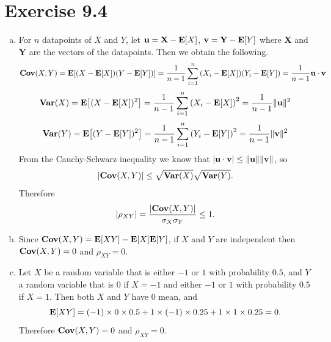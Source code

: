 \documentclass{article}
\begin{document}
\section*{Exercise 9.4}
\begin{enumerate}[(a)]
    \item For $n$ datapoints of $X$ and $Y$, let $\mathbf{u} = \mathbf{X} - \mathbf{E}\qty[X]$, $\mathbf{v} = \mathbf{Y} - \mathbf{E}\qty[Y]$ where $\mathbf{X}$ and $\mathbf{Y}$ are the vectors of the datapoints.
    Then we obtain the following.
    $$\mathbf{Cov}\qty(X, Y) = \mathbf{E}\qty[(X - \mathbf{E}\qty[X])(Y - \mathbf{E}\qty[Y])] = \frac{1}{n-1}\sum_{i=1}^{n}\qty(X_i - \mathbf{E}\qty[X])(Y_i - \mathbf{E}\qty[Y]) = \frac{1}{n-1}\mathbf{u}\cdot\mathbf{v}$$
    $$\mathbf{Var}\qty(X) = \mathbf{E}\qty[(X - \mathbf{E}\qty[X])^2] = \frac{1}{n-1}\sum_{i=1}^{n}\qty(X_i - \mathbf{E}\qty[X])^2 = \frac{1}{n-1}\lVert\mathbf{u}\rVert^2$$
    $$\mathbf{Var}\qty(Y) = \mathbf{E}\qty[(Y - \mathbf{E}\qty[Y])^2] = \frac{1}{n-1}\sum_{i=1}^{n}\qty(Y_i - \mathbf{E}\qty[Y])^2 = \frac{1}{n-1}\lVert\mathbf{v}\rVert^2$$
    From the Cauchy-Schwarz inequality we know that $\qty|\mathbf{u}\cdot\mathbf{v}| \leq \lVert\mathbf{u}\rVert\lVert\mathbf{v}\rVert$, so 
    $$\qty|\mathbf{Cov}\qty(X, Y)| \leq \sqrt{\mathbf{Var}\qty(X)}\sqrt{\mathbf{Var}\qty(Y)}.$$
    Therefore
    $$\qty|\rho_{XY}| = \frac{\qty|\mathbf{Cov}\qty(X, Y)|}{\sigma_X\sigma_Y} \leq 1.$$
    \item Since $\mathbf{Cov}\qty(X, Y) = \mathbf{E}\qty[XY] - \mathbf{E}\qty[X]\mathbf{E}\qty[Y]$, if $X$ and $Y$ are independent then $\mathbf{Cov}\qty(X, Y) = 0$ and $\rho_{XY} = 0$.
    \item Let $X$ be a random variable that is either $-1$ or $1$ with probability $0.5$, and $Y$ a random variable that is $0$ if $X = -1$ and either $-1$ or $1$ with probability $0.5$ if $X = 1$.
    Then both $X$ and $Y$ have $0$ mean, and 
    $$\mathbf{E}\qty[XY] = (-1) \times 0 \times 0.5 + 1 \times (-1) \times 0.25 + 1 \times 1 \times 0.25 = 0.$$
    Therefore $\mathbf{Cov}\qty(X, Y) = 0$ and $\rho_{XY} = 0$.
\end{enumerate}
\end{document}
